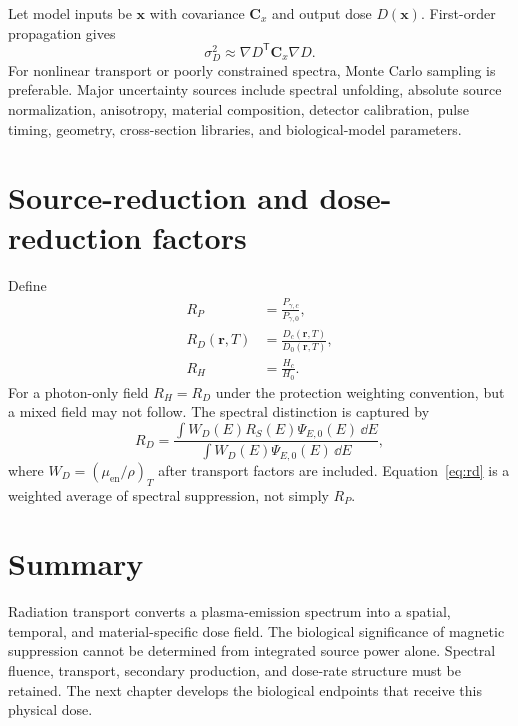 Let model inputs be $\mathbf{x}$ with covariance $\mathbf{C}_x$ and output dose $D(\mathbf{x})$. First-order propagation gives
\begin{equation}
\sigma_D^2\approx
\nabla D^{\mathsf T}\mathbf{C}_x\nabla D.
\label{eq:uncertainty}
\end{equation}
For nonlinear transport or poorly constrained spectra, Monte Carlo sampling is preferable. Major uncertainty sources include spectral unfolding, absolute source normalization, anisotropy, material composition, detector calibration, pulse timing, geometry, cross-section libraries, and biological-model parameters.

\section{Source-reduction and dose-reduction factors}

Define
\begin{align}
R_P&=\frac{P_{\gamma,c}}{P_{\gamma,0}},\\
R_D(\mathbf{r},T)&=\frac{D_c(\mathbf{r},T)}{D_0(\mathbf{r},T)},\\
R_H&=\frac{H_c}{H_0}.
\end{align}
For a photon-only field $R_H=R_D$ under the protection weighting convention, but a mixed field may not follow. The spectral distinction is captured by
\begin{equation}
R_D=
\frac{\int W_D(E)R_S(E)\Psi_{E,0}(E)\,\dd E}
{\int W_D(E)\Psi_{E,0}(E)\,\dd E},
\label{eq:rd}
\end{equation}
where $W_D=(\mu_{\mathrm{en}}/\rho)_T$ after transport factors are included. Equation~\eqref{eq:rd} is a weighted average of spectral suppression, not simply $R_P$.

\section{Summary}

Radiation transport converts a plasma-emission spectrum into a spatial, temporal, and material-specific dose field. The biological significance of magnetic suppression cannot be determined from integrated source power alone. Spectral fluence, transport, secondary production, and dose-rate structure must be retained. The next chapter develops the biological endpoints that receive this physical dose.

